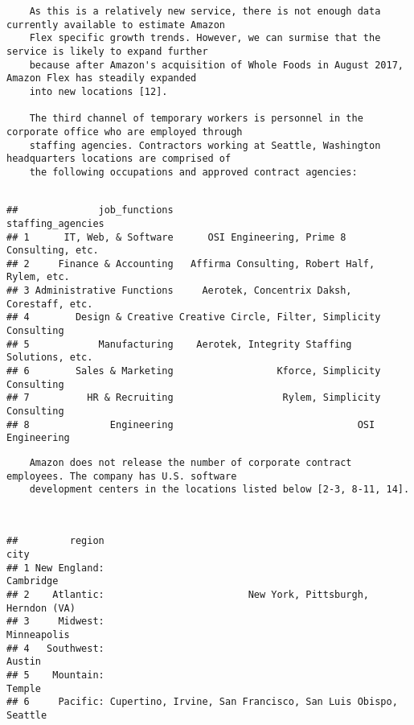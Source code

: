 \documentclass[]{article}
\begin{document}
\begin{verbatim}
    As this is a relatively new service, there is not enough data currently available to estimate Amazon 
    Flex specific growth trends. However, we can surmise that the service is likely to expand further 
    because after Amazon's acquisition of Whole Foods in August 2017, Amazon Flex has steadily expanded 
    into new locations [12].
    
    The third channel of temporary workers is personnel in the corporate office who are employed through 
    staffing agencies. Contractors working at Seattle, Washington headquarters locations are comprised of 
    the following occupations and approved contract agencies:
    
\end{verbatim}

\begin{verbatim}
##              job_functions                              staffing_agencies
## 1      IT, Web, & Software      OSI Engineering, Prime 8 Consulting, etc.
## 2     Finance & Accounting   Affirma Consulting, Robert Half, Rylem, etc.
## 3 Administrative Functions     Aerotek, Concentrix Daksh, Corestaff, etc.
## 4        Design & Creative Creative Circle, Filter, Simplicity Consulting
## 5            Manufacturing    Aerotek, Integrity Staffing Solutions, etc.
## 6        Sales & Marketing                  Kforce, Simplicity Consulting
## 7          HR & Recruiting                   Rylem, Simplicity Consulting
## 8              Engineering                                OSI Engineering
\end{verbatim}

\begin{verbatim}
    Amazon does not release the number of corporate contract employees. The company has U.S. software 
    development centers in the locations listed below [2-3, 8-11, 14].      
    
            
\end{verbatim}

\begin{verbatim}
##         region                                                       city
## 1 New England:                                                  Cambridge
## 2    Atlantic:                         New York, Pittsburgh, Herndon (VA)
## 3     Midwest:                                                Minneapolis
## 4   Southwest:                                                     Austin
## 5    Mountain:                                                     Temple
## 6     Pacific: Cupertino, Irvine, San Francisco, San Luis Obispo, Seattle
\end{verbatim}
\end{document}
